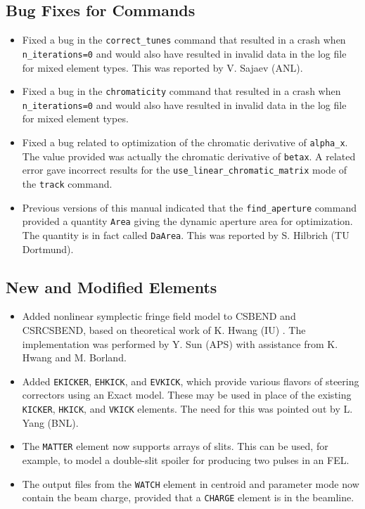 \documentclass[11pt]{article}
\begin{document}
\subsection{Bug Fixes for Commands}
\begin{itemize}
\item Fixed a bug in the \verb|correct_tunes| command that resulted in a crash when \verb|n_iterations=0| and would also have
  resulted in invalid data in the log file for mixed element types. This was reported by V. Sajaev (ANL).
\item Fixed a bug in the \verb|chromaticity| command that resulted in a crash when \verb|n_iterations=0| and would also have
  resulted in invalid data in the log file for mixed element types.
\item Fixed a bug related to optimization of the chromatic derivative of \verb|alpha_x|. The value provided was actually the
  chromatic derivative of \verb|betax|. A related error gave incorrect results for the \verb|use_linear_chromatic_matrix| mode of 
  the \verb|track| command.
\item Previous versions of this manual indicated that the \verb|find_aperture| command provided a quantity \verb|Area| giving
  the dynamic aperture area for optimization. The quantity is in fact called \verb|DaArea|. This was reported by S. Hilbrich (TU Dortmund).
\end{itemize}

\subsection{New and Modified Elements}
\begin{itemize}
\item Added nonlinear symplectic fringe field model to CSBEND and CSRCSBEND, based on theoretical work of K. Hwang (IU) \cite{KHwang}. The implementation was
  performed by Y. Sun (APS) with assistance from K. Hwang and M. Borland.
\item Added \verb|EKICKER|, \verb|EHKICK|, and \verb|EVKICK|, which provide various flavors of steering correctors using an Exact 
  model. These may be used in place of the existing \verb|KICKER|, \verb|HKICK|, and \verb|VKICK| elements.
  The need for this was pointed out by L. Yang (BNL).
\item The \verb|MATTER| element now supports arrays of slits. This can be used, for example, to model a double-slit spoiler for
  producing two pulses in an FEL.
\item The output files from the \verb|WATCH| element in centroid and parameter mode now contain the beam charge, provided that
  a \verb|CHARGE| element is in the beamline.
\end{itemize}
\end{document}
